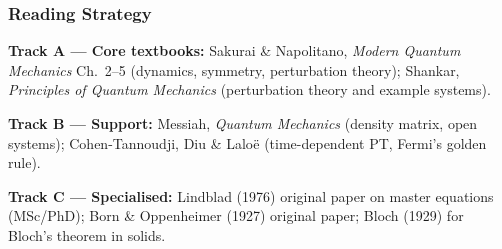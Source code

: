 \documentclass[11pt,a4paper]{article}
\begin{document}
\subsubsection*{Reading Strategy}

\noindent\textbf{Track A --- Core textbooks:}
Sakurai \& Napolitano, \textit{Modern Quantum Mechanics} Ch.~2--5 (dynamics, symmetry, perturbation theory);
Shankar, \textit{Principles of Quantum Mechanics} (perturbation theory and example systems).

\noindent\textbf{Track B --- Support:}
Messiah, \textit{Quantum Mechanics} (density matrix, open systems);
Cohen-Tannoudji, Diu \& Lalo\"e (time-dependent PT, Fermi's golden rule).

\noindent\textbf{Track C --- Specialised:}
Lindblad (1976) original paper on master equations (MSc/PhD);
Born \& Oppenheimer (1927) original paper;
Bloch (1929) for Bloch's theorem in solids.

\newpage
\end{document}
